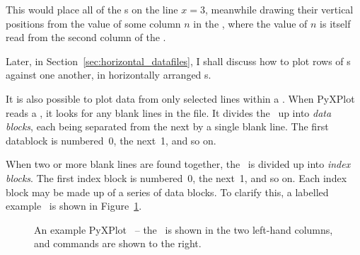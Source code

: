 \noindent This would place all of the \datapoint s on the line $x=3$, meanwhile
drawing their vertical positions from the value of some column $n$ in the
\datafile, where the value of $n$ is itself read from the second column of the
\datafile.

Later, in Section~\ref{sec:horizontal_datafiles}, I shall discuss how to plot
rows of \datafile s against one another, in horizontally arranged \datafile s.

It is also possible to plot data from only selected lines within a \datafile.
When PyXPlot reads a \datafile, it looks for any blank lines in the file. It
divides the \datafile\ up into {\it data blocks}, each being separated from the
next by a single blank line. The first datablock is numbered~0, the next~1, and
so on.  

When two or more blank lines are found together, the \datafile\ is divided up
into {\it index blocks}. The first index block is numbered~0, the next~1, and
so on. Each index block may be made up of a series of data blocks. To clarify
this, a labelled example \datafile\ is shown in
Figure~\ref{fig:sample_datafile}.

\begin{figure}
\caption{An example PyXPlot \datafile\ -- the \datafile\ is shown in the two left-hand columns, and commands are shown to the right.}
\label{fig:sample_datafile}
\end{figure}

